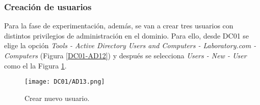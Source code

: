 \subsubsection{Creación de usuarios}

Para la fase de experimentación, además, se van a crear tres usuarios con distintos privilegios de administración en el dominio. Para ello, desde DC01 se elige la opción {\it Tools - Active Directory Users and Computers - Laboratory.com - Computers} (Figura \ref{DC01-AD12}) y después se selecciona {\it Users - New - User} como el la Figura \ref{DC01-AD13}. 

\begin{figure}[H] %
\begin{center}
\texttt{[image: DC01/AD13.png]}
\end{center}
\caption{Crear nuevo usuario.}
\label{DC01-AD13}
\end{figure}

